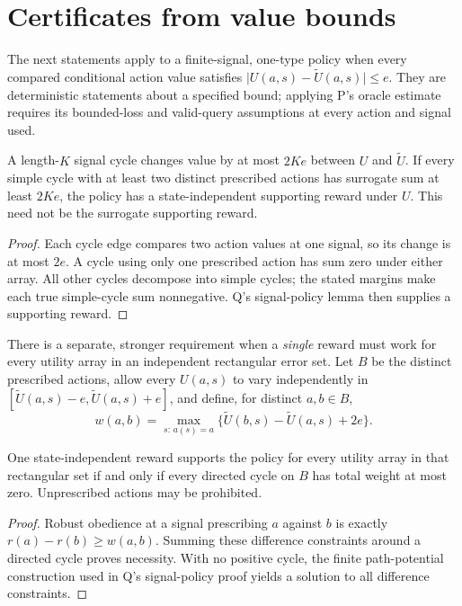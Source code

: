 \documentclass{article}
\begin{document}
\section{Certificates from value bounds}

The next statements apply to a finite-signal, one-type policy when every compared conditional action value satisfies \(\lvert U(a,s)-\widetilde U(a,s)\rvert\leq e\). They are deterministic statements about a specified bound; applying P's oracle estimate requires its bounded-loss and valid-query assumptions at every action and signal used. %

\begin{proposition}\label{prop:margin}
A length-\(K\) signal cycle changes value by at most \(2Ke\) between \(U\) and \(\widetilde U\). If every simple cycle with at least two distinct prescribed actions has surrogate sum at least \(2Ke\), the policy has a state-independent supporting reward under \(U\). This need not be the surrogate supporting reward. %
\end{proposition}

\begin{proof}
Each cycle edge compares two action values at one signal, so its change is at most \(2e\). A cycle using only one prescribed action has sum zero under either array. All other cycles decompose into simple cycles; the stated margins make each true simple-cycle sum nonnegative. Q's signal-policy lemma then supplies a supporting reward. %
\end{proof}

There is a separate, stronger requirement when a \emph{single} reward must work for every utility array in an independent rectangular error set. Let \(B\) be the distinct prescribed actions, allow every \(U(a,s)\) to vary independently in \([\widetilde U(a,s)-e,\widetilde U(a,s)+e]\), and define, for distinct \(a,b\in B\),
\[
w(a,b)=\max_{s:\,a(s)=a}
\bigl\{\widetilde U(b,s)-\widetilde U(a,s)+2e\bigr\}.
\]

\begin{proposition}\label{prop:robust}
One state-independent reward supports the policy for every utility array in that rectangular set if and only if every directed cycle on \(B\) has total weight at most zero. Unprescribed actions may be prohibited. %
\end{proposition}

\begin{proof}
Robust obedience at a signal prescribing \(a\) against \(b\) is exactly \(r(a)-r(b)\geq w(a,b)\). Summing these difference constraints around a directed cycle proves necessity. With no positive cycle, the finite path-potential construction used in Q's signal-policy proof yields a solution to all difference constraints. %
\end{proof}
\end{document}

